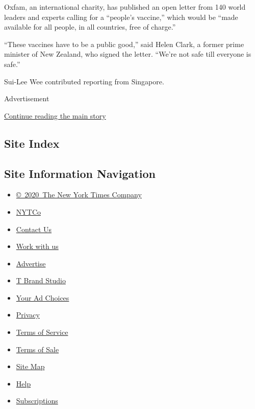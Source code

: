 Oxfam, an international charity, has published an open letter from 140
world leaders and experts calling for a ``people's vaccine,'' which
would be ``made available for all people, in all countries, free of
charge.''

``These vaccines have to be a public good,'' said Helen Clark, a former
prime minister of New Zealand, who signed the letter. ``We're not safe
till everyone is safe.''

Sui-Lee Wee contributed reporting from Singapore.

Advertisement

\protect\hyperlink{after-bottom}{Continue reading the main story}

\hypertarget{site-index}{%
\subsection{Site Index}\label{site-index}}

\hypertarget{site-information-navigation}{%
\subsection{Site Information
Navigation}\label{site-information-navigation}}

\begin{itemize}
\tightlist
\item
  \href{https://help.nytimes.com/hc/en-us/articles/115014792127-Copyright-notice}{©~2020~The
  New York Times Company}
\end{itemize}

\begin{itemize}
\tightlist
\item
  \href{https://www.nytco.com/}{NYTCo}
\item
  \href{https://help.nytimes.com/hc/en-us/articles/115015385887-Contact-Us}{Contact
  Us}
\item
  \href{https://www.nytco.com/careers/}{Work with us}
\item
  \href{https://nytmediakit.com/}{Advertise}
\item
  \href{http://www.tbrandstudio.com/}{T Brand Studio}
\item
  \href{https://www.nytimes.com/privacy/cookie-policy\#how-do-i-manage-trackers}{Your
  Ad Choices}
\item
  \href{https://www.nytimes.com/privacy}{Privacy}
\item
  \href{https://help.nytimes.com/hc/en-us/articles/115014893428-Terms-of-service}{Terms
  of Service}
\item
  \href{https://help.nytimes.com/hc/en-us/articles/115014893968-Terms-of-sale}{Terms
  of Sale}
\item
  \href{https://spiderbites.nytimes.com}{Site Map}
\item
  \href{https://help.nytimes.com/hc/en-us}{Help}
\item
  \href{https://www.nytimes.com/subscription?campaignId=37WXW}{Subscriptions}
\end{itemize}
